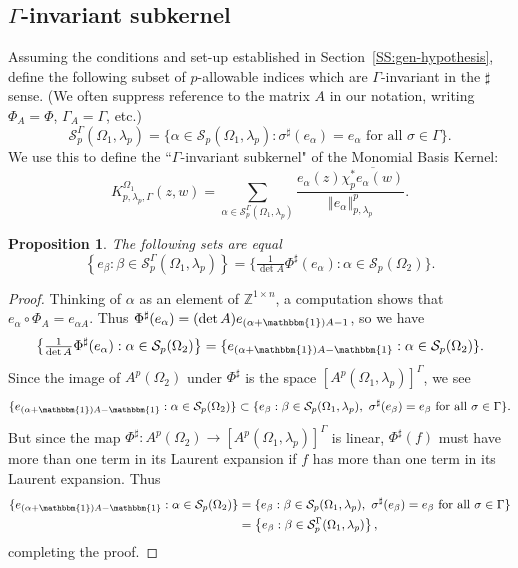 \documentclass[letterpaper,11pt,reqno]{amsart}
\theoremstyle{plain}
\newtheorem{proposition}[equation]{Proposition}
\theoremstyle{definition}
\theoremstyle{remark}
\theoremstyle{remark}
\numberwithin{equation}{section}
\newcommand{\one}{\mathbbm{1}}
\newcommand{\norm}[1]{\left\Vert#1\right\Vert}
\newcommand{\ol}{\overline}
\newcommand{\cs}{{\mathcal S}}
\newcommand{\Z}{{\mathbb Z}}
\begin{document}
\subsection{\texorpdfstring{$\Gamma$}{Gamma}-invariant subkernel}\label{SS:Gamma-invMBPandMBK}
Assuming the conditions and set-up established in Section~\ref{SS:gen-hypothesis}, define the following subset of $p$-allowable indices which are $\Gamma$-invariant in the $\sharp$ sense. (We often suppress reference to the matrix $A$ in our notation, writing $\Phi_A = \Phi$, $\Gamma_A = \Gamma$, etc.)
\begin{equation}\label{E:gamma-inv-allowable-indices}
\cs_p^\Gamma(\Omega_1,\lambda_p) = \{\alpha \in \cs_p(\Omega_1,\lambda_p): \sigma^\sharp(e_\alpha) = e_\alpha \textrm{ for all } \sigma \in \Gamma  \}.
\end{equation}
We use this to define the ``$\Gamma$-invariant subkernel" of the Monomial Basis Kernel:
\begin{equation}\label{E:Gamma-inv-MBK}
K_{p,\lambda_p,\Gamma}^{\Omega_1}(z,w) 
 = \sum_{\alpha \in \cs_{p}^{\Gamma}(\Omega_1,\lambda_p)} \frac{e_\alpha(z) \ol{\chi_p^*e_\alpha(w)}}{\norm{e_\alpha}_{p,\lambda_p}^p}.
\end{equation}

\begin{proposition}\label{P:Gamma-inv-allowable-indices}
The following sets are equal
\[
\left\{ e_\beta : \beta \in \cs_p^\Gamma(\Omega_1, \lambda_p) \right\} = \big\{ \tfrac{1}{\det A }\Phi^\sharp(e_\alpha): \alpha\in  \cs_p(\Omega_2) \big\}.
\]
\end{proposition}
\begin{proof}
Thinking of $\alpha$ as an element of $\Z^{1 \times n}$, a computation shows that $e_\alpha \circ \Phi_A = e_{\alpha A}$.  Thus
$\Phi^\sharp(e_\alpha) = (\det A) e_{(\alpha + \one)A-1}$, so we have
\begin{equation}\label{E:Schauder-simp}
\big\{ \tfrac{1}{\det A}\Phi^\sharp(e_\alpha): \alpha \in \cs_p(\Omega_2) \big\}
=\{ e_{(\alpha+\one)A-\one}:\alpha\in \cs_p(\Omega_2)\}.
\end{equation}
Since the image of $A^p(\Omega_2)$ under $\Phi^\sharp$ is the space $[A^p(\Omega_1,\lambda_p)]^\Gamma$, we see
\[
\{e_{(\alpha+\one)A-\one}:\alpha\in \cs_p(\Omega_2)\}
\subset \{ e_\beta: \beta\in \cs_p(\Omega_1,\lambda_p), \,\, \sigma^\sharp(e_\beta) = e_\beta \text{ for all } \sigma\in\Gamma\}.
\]
But since the map $\Phi^\sharp:A^p(\Omega_2) \to [A^p(\Omega_1,\lambda_p)]^\Gamma$ is linear, $\Phi^\sharp(f)$ must have more than one term in its Laurent expansion if $f$ has more than one term in its Laurent expansion.  Thus
\begin{align*}
\{ e_{(\alpha+\one)A-\one}:\alpha\in \cs_p(\Omega_2)\}
&= \{ e_\beta: \beta\in \cs_p(\Omega_1,\lambda_p), \,\, \sigma^\sharp(e_\beta)=e_\beta \text{ for all } \sigma\in\Gamma\}\nonumber\\
&= \left\{ e_\beta : \beta \in \cs_p^\Gamma(\Omega_1, \lambda_p) \right\},
\end{align*}
completing the proof.
\end{proof}
\end{document}
